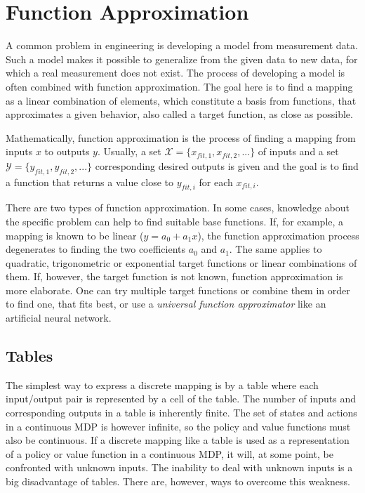 
\chapter{Function Approximation}
\label{chapter4}

A common problem in engineering is developing a model from measurement data. Such a model makes it possible to generalize from the given data to new data, for which a real measurement does not exist. The process of developing a model is often combined with function approximation. The goal here is to find a mapping as a linear combination of elements, which constitute a basis from functions, that approximates a given behavior, also called a target function, as close as possible.

Mathematically, function approximation is the process of finding a mapping from inputs $x$ to outputs $y$. Usually, a set $\mathcal{X}=\{x_{fit,1},x_{fit,2},...\}$ of inputs and a set $\mathcal{Y}=\{y_{fit,1},y_{fit,2},...\}$ corresponding desired outputs is given and the goal is to find a function that returns a value close to $y_{fit,i}$ for each $x_{fit,i}$.

There are two types of function approximation. In some cases, knowledge about the specific problem can help to find suitable base functions. If, for example, a mapping is known to be linear ($y=a_0 + a_1 x$), the function approximation process degenerates to finding the two coefficients $a_0$ and $a_1$. The same applies to quadratic, trigonometric or exponential target functions or linear combinations of them. If, however, the target function is not known, function approximation is more elaborate. One can try multiple target functions or combine them in order to find one, that fits best, or use a \textit{universal function approximator} like an artificial neural network. 

\section{Tables}

The simplest way to express a discrete mapping is by a table where each input/output pair is represented by a cell of the table. The number of inputs and corresponding outputs in a table is inherently finite. The set of states and actions in a continuous MDP is however infinite, so the policy and value functions must also be continuous. If a discrete mapping like a table is used as a representation of a policy or value function in a continuous MDP, it will, at some point, be confronted with unknown inputs. The inability to deal with unknown inputs is a big disadvantage of tables. There are, however, ways to overcome this weakness.

